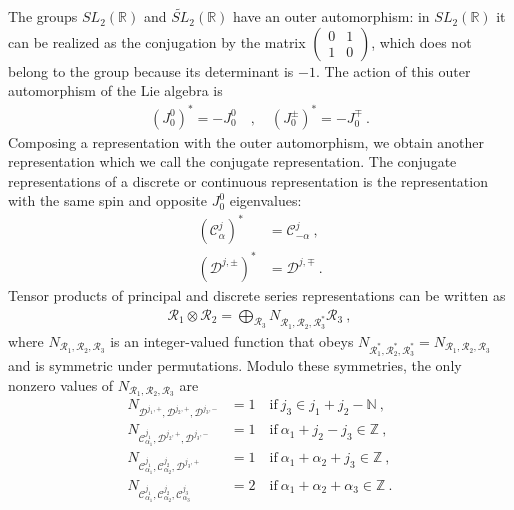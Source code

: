 \documentclass[12pt, a4paper, notitlepage, twoside]{report}
\numberwithin{equation}{section}
\theoremstyle{break}
\begin{document}
The groups $SL_2(\mathbb{R})$ and $\widetilde{SL}_2(\mathbb{R})$ have an outer automorphism: in $SL_2(\mathbb{R})$ it can be realized as the conjugation by the matrix $\left(\begin{smallmatrix} 0 & 1 \\ 1 & 0\end{smallmatrix}\right)$, which does not belong to the group because its determinant is $-1$. The action of this outer automorphism of the Lie algebra is 
\begin{align}
 (J_0^0)^* = -J_0^0 \quad , \quad (J_0^\pm)^* = - J_0^\mp\ .
\end{align}
Composing a representation with the outer automorphism, we obtain another representation which we call the conjugate representation. The conjugate representations of a discrete or continuous representation is the representation with the same spin and opposite $J_0^0$ eigenvalues:
\begin{align}
 (\mathcal{C}^j_\alpha)^* &= \mathcal{C}^j_{-\alpha} \ , 
\\
 (\mathcal{D}^{j,\pm})^* &= \mathcal{D}^{j,\mp}\ .
\end{align}
Tensor products of principal and discrete series representations can be written as 
\begin{align}
 \mathcal{R}_1\otimes \mathcal{R}_2 = \bigoplus_{\mathcal{R}_3} N_{\mathcal{R}_1,\mathcal{R}_2,\mathcal{R}_3^*} \mathcal{R}_3\ ,
\label{ror}
\end{align}
where $N_{\mathcal{R}_1,\mathcal{R}_2,\mathcal{R}_3}$ is an integer-valued function that obeys $N_{\mathcal{R}_1^*,\mathcal{R}_2^*,\mathcal{R}_3^*}=N_{\mathcal{R}_1,\mathcal{R}_2,\mathcal{R}_3}$ and is symmetric under permutations.
Modulo these symmetries, the only nonzero values of $N_{\mathcal{R}_1,\mathcal{R}_2,\mathcal{R}_3}$ are
\begin{align}
N_{\mathcal{D}^{j_1,+},\mathcal{D}^{j_2,+},\mathcal{D}^{j_3,-}} &= 1 \quad \text{if}\ j_3\in j_1+j_2-{\mathbb{N}}\ ,
\label{nddd}
\\
N_{\mathcal{C}^{j_1}_{\alpha_1},\mathcal{D}^{j_2,+},\mathcal{D}^{j_3,-}} &= 1 \quad \text{if}\ \alpha_1+j_2-j_3\in{\mathbb{Z}}\ ,
\\
 N_{\mathcal{C}^{j_1}_{\alpha_1},\mathcal{C}^{j_2}_{\alpha_2},\mathcal{D}^{j_3,+}} &= 1 \quad \text{if}\ \alpha_1+\alpha_2+j_3\in {\mathbb{Z}}\ ,
\\
N_{\mathcal{C}^{j_1}_{\alpha_1},\mathcal{C}^{j_2}_{\alpha_2},\mathcal{C}^{j_3}_{\alpha_3}} &= 2 \quad \text{if}\ \alpha_1+\alpha_2+\alpha_3\in {\mathbb{Z}}\ .
\end{align}
\end{document}
